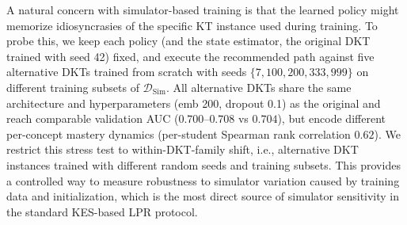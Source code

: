 \documentclass[sigconf,anonymous]{acmart}
\begin{document}
A natural concern with simulator-based training is that the learned policy might memorize idiosyncrasies of the specific KT instance used during training. To probe this, we keep each policy (and the state estimator, the original DKT trained with seed 42) fixed, and execute the recommended path against five alternative DKTs trained from scratch with seeds $\{7, 100, 200, 333, 999\}$ on different training subsets of $\mathcal{D}_{\text{Sim}}$. All alternative DKTs share the same architecture and hyperparameters (emb 200, dropout 0.1) as the original and reach comparable validation AUC ($0.700$--$0.708$ vs $0.704$), but encode different per-concept mastery dynamics (per-student Spearman rank correlation $0.62$). We restrict this stress test to within-DKT-family shift, i.e., alternative DKT instances trained with different random seeds and training subsets. This provides a controlled way to measure robustness to simulator variation caused by training data and initialization, which is the most direct source of simulator sensitivity in the standard KES-based LPR protocol.
\end{document}
